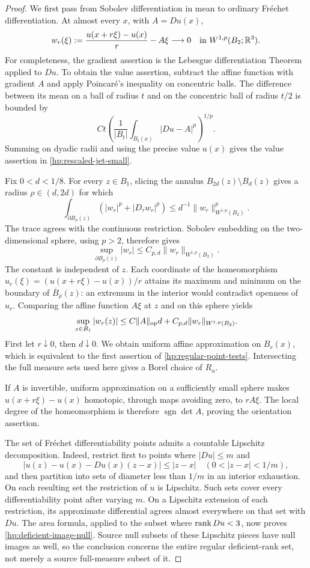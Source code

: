 \begin{proof}
We first pass from Sobolev differentiation in mean to ordinary
Fr\'echet differentiation.  At almost every $x$, with $A=Du(x)$,
\begin{equation}\label{hp:rescaled-jet-small}
 w_r(\xi):=\frac{u(x+r\xi)-u(x)}{r}-A\xi
 \longrightarrow0 \quad\hbox{in }W^{1,p}(B_2;\mathbb R^3).
\end{equation}
For completeness, the gradient assertion is the Lebesgue differentiation
Theorem applied to $Du$.  To obtain the value assertion, subtract the
affine function with gradient $A$ and apply Poincar\'e's inequality on
concentric balls.  The difference between its mean on a ball of radius
$t$ and on the concentric ball of radius $t/2$ is bounded by
\[
 Ct\left(\frac{1}{|B_t|}\int_{B_t(x)}|Du-A|^p\right)^{1/p}.
\]
Summing on dyadic radii and using the precise value $u(x)$ gives the
value assertion in \eqref{hp:rescaled-jet-small}.

Fix $0<d<1/8$.  For every $z\in B_1$, slicing the annulus
$B_{2d}(z)\setminus B_d(z)$ gives a radius $\rho\in(d,2d)$ for which
\[
 \int_{\partial B_\rho(z)}
   (|w_r|^p+|D_\tau w_r|^p)
 \le d^{-1}\|w_r\|_{W^{1,p}(B_2)}^p.
\]
The trace agrees with the continuous restriction.  Sobolev embedding
on the two-dimensional sphere, using $p>2$, therefore gives
\[
 \sup_{\partial B_\rho(z)}|w_r|
 \le C_{p,d}\|w_r\|_{W^{1,p}(B_2)}.
\]
The constant is independent of $z$.  Each coordinate of the
homeomorphism
$u_r(\xi)=(u(x+r\xi)-u(x))/r$ attains its maximum and minimum on
the boundary of $\overline B_\rho(z)$: an extremum in the interior
would contradict openness of $u_r$.  Comparing the affine function
$A\xi$ at $z$ and on this sphere yields
\[
 \sup_{z\in B_1}|w_r(z)|
 \le C\|A\|_{\mathrm{op}}d+C_{p,d}\|w_r\|_{W^{1,p}(B_2)}.
\]
First let $r\downarrow0$, then $d\downarrow0$.  We obtain uniform
affine approximation on $B_r(x)$, which is equivalent to the first
assertion of \eqref{hp:regular-point-tests}.  Intersecting the full
measure sets used here gives a Borel choice of $R_u$.

If $A$ is invertible, uniform approximation on a sufficiently small
sphere makes $u(x+r\xi)-u(x)$ homotopic, through maps avoiding zero,
to $rA\xi$.  The local degree of the homeomorphism is therefore
$\operatorname{sgn}\det A$, proving the orientation assertion.

The set of Fr\'echet differentiability points admits a countable
Lipschitz decomposition.  Indeed, restrict first to points where
$|Du|\le m$ and
\[
 |u(z)-u(x)-Du(x)(z-x)|\le |z-x|
 \quad(0<|z-x|<1/m),
\]
and then partition into sets of diameter less than $1/m$ in an
interior exhaustion.  On each resulting set the restriction of $u$
is Lipschitz.  Such sets cover every differentiability point after
varying $m$.  On a Lipschitz extension of each restriction, its
approximate differential agrees almost everywhere on that set with
$Du$.  The area formula, applied to the subset where $\operatorname{rank} Du<3$,
now proves \eqref{hp:deficient-image-null}.  Source null subsets of
these Lipschitz pieces have null images as well, so the conclusion
concerns the entire regular deficient-rank set, not merely a source
full-measure subset of it.


\end{proof}

